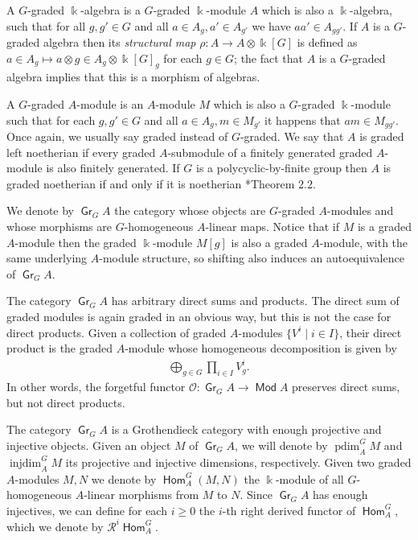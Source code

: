 \documentclass[11pt,fleqn]{article}
\newcommand\ot{\otimes}
\renewcommand\to{\longrightarrow}
\renewcommand\k{\Bbbk}
\renewcommand\O{\mathcal O}
\newcommand\R{\mathcal R}
\DeclareMathOperator\Mod{\mathsf{Mod}}
\DeclareMathOperator\Gr{\mathsf{Gr}}
\DeclareMathOperator\Hom{\mathsf{Hom}}
\DeclareMathOperator\injdim{injdim}
\DeclareMathOperator\projdim{pdim}
\begin{document}
A $G$-graded $\k$-algebra is a $G$-graded $\k$-module $A$ which is also a 
$\k$-algebra, such that for all $g,g' \in G$ and all $a \in A_g, a' \in A_{g'}$
we have $aa' \in A_{gg'}$. If $A$ is a $G$-graded algebra then its
\emph{structural map} $\rho: A \to A \ot \k[G]$ is defined as $a \in A_g 
\mapsto a \ot g \in A_g \ot \k[G]_g$ for each $g \in G$; the fact that $A$ is 
a $G$-graded algebra implies that this is a morphism of algebras.

A $G$-graded $A$-module is an $A$-module $M$ which is also a $G$-graded 
$\k$-module such that for each $g,g' \in G$ and all $a \in A_g, 
m \in M_{g'}$ it happens that $am \in M_{gg'}$. Once again, we usually say 
graded instead of $G$-graded. We say that $A$ is graded left noetherian if
every graded $A$-submodule of a finitely generated graded $A$-module is
also finitely generated. If $G$ is a polycyclic-by-finite group then $A$ is
graded noetherian if and only if it is noetherian 
\cite{CQ-polycyclic}*{Theorem 2.2}.

We denote by $\Gr_G A$ the category whose objects are $G$-graded
$A$-modules and whose morphisms are $G$-homogeneous $A$-linear maps. 
Notice that if $M$ is a graded $A$-module then the graded $\k$-module $M[g]$
is also a graded $A$-module, with the same underlying $A$-module structure,
so shifting also induces an autoequivalence of $\Gr_G A$. 

The category $\Gr_G A$ has arbitrary direct sums and products. The direct sum
of graded modules is again graded in an obvious way, but this is not the case
for direct products. Given a collection of graded $A$-modules $\{V^i \mid i 
\in I\}$, their direct product is the graded $A$-module whose homogeneous 
decomposition is given by
\begin{align*}
\bigoplus_{g \in G} \prod_{i \in I} V^i_g.
\end{align*}
In other words, the forgetful functor $\O: \Gr_G A \to \Mod A$ preserves
direct sums, but not direct products.

The category $\Gr_G A$ is a Grothendieck category with enough projective and 
injective objects. Given an object $M$ of $\Gr_G A$, we will denote by 
$\projdim_A^G M$ and $\injdim_A^G M$ its projective and injective dimensions, 
respectively. Given two graded $A$-modules $M, N$ we denote by $\Hom^G_A(M,N)$ 
the $\k$-module of all $G$-homogeneous $A$-linear morphisms from $M$ to $N$. 
Since $\Gr_G A$ has enough injectives, we can define for each $i \geq 0$ the 
$i$-th right derived functor of $\Hom^G_A$, which we denote by $\R^i\Hom^G_A$. 
\end{document}
